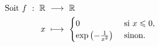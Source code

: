\begin{alignat*}{2}
    \text{Soit } f\ :\ \R\ &\longrightarrow\ \R\\
    x\ &\longmapsto\ 
    \begin{cases}
        0 &\text{ si } x \leqslant 0,\\
        \exp \left(-\frac{1}{x^2}\right) &\text{ sinon}.
    \end{cases}
\end{alignat*}
        